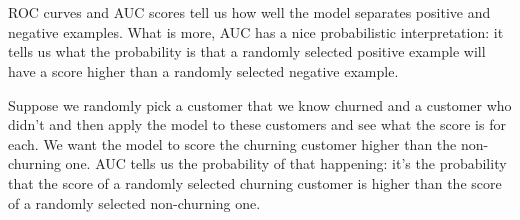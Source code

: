 \chapter{}
\section{}
\subsection{}
ROC curves and AUC scores tell us how well the model separates positive and negative examples. What is more, AUC has a nice probabilistic interpretation: it tells us what the probability is that a randomly selected positive example will have a score higher than a randomly selected negative example.

Suppose we randomly pick a customer that we know churned and a customer who didn't and then apply the model to these customers and see what the score is for each. We want the model to score the churning customer higher than the non-churning one. AUC tells us the probability of that happening: it's the probability that the score of a randomly selected churning customer is higher than the score of a randomly selected non-churning one.